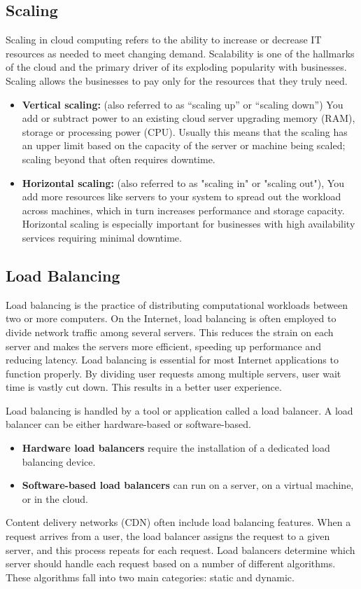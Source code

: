 	\subsection{Scaling}
		Scaling \cite{scaling} in cloud computing refers to the ability to increase or decrease IT resources as
		needed to meet changing demand. Scalability is one of the hallmarks of the cloud and the primary driver 
		of its exploding popularity with businesses. Scaling allows the businesses to pay only for the resources that
		they truly need.
		\begin{itemize}
			\item \textbf{Vertical scaling:} (also referred to as “scaling up” or “scaling down”) 
			You add or subtract power to an existing cloud server upgrading memory (RAM),
			storage or processing power (CPU).
			Usually this means that the scaling has an upper limit based on the capacity of the server
			or machine being scaled; scaling beyond that often requires downtime.
			\item \textbf{Horizontal scaling:} (also referred to as "scaling in" or "scaling out"), 
			You add more resources like servers to your system to spread out the workload across machines, 
			which in turn increases performance and storage capacity. 
			Horizontal scaling is especially important for businesses with high availability services requiring 
			minimal downtime.
		\end{itemize}

	\subsection{Load Balancing}
		Load balancing \cite{loadbalancing} is the practice of distributing computational workloads between two or more computers. 
		On the Internet, load balancing is often employed to divide network traffic among several servers. 
		This reduces the strain on each server and makes the servers more efficient, speeding up performance and 
		reducing latency. Load balancing is essential for most Internet applications to function properly. 
		By dividing user requests among multiple servers, user wait time is vastly cut down. 
		This results in a better user experience.

		Load balancing is handled by a tool or application called a load balancer. A load balancer can be 
		either hardware-based or software-based. 
		\begin{itemize}
			\item \textbf{Hardware load balancers} require the installation of a 
		dedicated load balancing device.
			\item \textbf{Software-based load balancers} can run on a server, on a virtual machine, 
		or in the cloud.
		\end{itemize}
		Content delivery networks (CDN) often include load balancing features.
		When a request arrives from a user, the load balancer assigns the request to a given server, 
		and this process repeats for each request. Load balancers determine which server should handle each request 
		based on a number of different algorithms. These algorithms fall into two main categories: static and dynamic.

